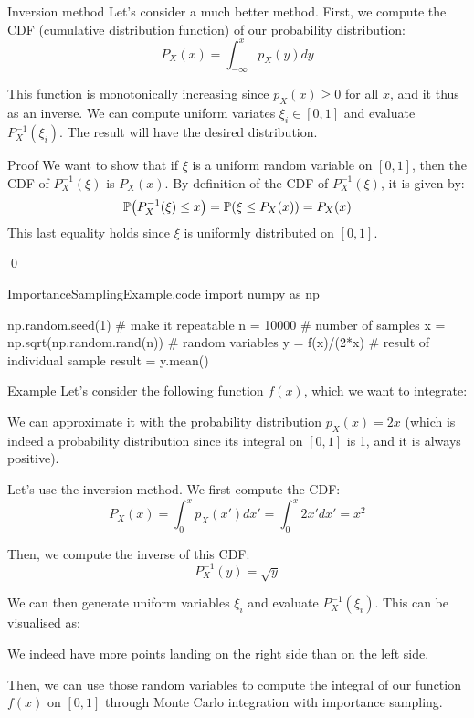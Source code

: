 \documentclass[a4paper]{article}
\begin{document}
\begin{parag}{Inversion method}
    Let's consider a much better method. First, we compute the CDF (cumulative distribution function) of our probability distribution: 
    \[P_{X}\left(x\right) = \int_{-\infty}^{x} p_X\left(y\right) d y\]
    
    This function is monotonically increasing since $p_X\left(x\right) \geq 0$ for all $x$, and it thus as an inverse. We can compute uniform variates $\xi_i \in \left[0, 1\right]$ and evaluate $P_X^{-1}\left(\xi_i\right)$. The result will have the desired distribution.

    \begin{subparag}{Proof}
        We want to show that if $\xi$ is a uniform random variable on $\left[0, 1\right]$, then the CDF of $P_X^{-1}\left(\xi\right)$ is $P_X\left(x\right)$. By definition of the CDF of $P_X^{-1}\left(\xi\right)$, it is given by:
        \[\prob\left(P_{X}^{-1}\left(\xi\right) \leq x\right) = \prob\left(\xi \leq P_{X}\left(x\right)\right) = P_{X}\left(x\right)\]
        This last equality holds since $\xi$ is uniformly distributed on $\left[0, 1\right]$.

        \qed
    \end{subparag}
\end{parag}

\begin{filecontents*}[overwrite]{ImportanceSamplingExample.code}
import numpy as np

np.random.seed(1)  # make it repeatable
n = 10000  # number of samples
x = np.sqrt(np.random.rand(n))  # random variables
y = f(x)/(2*x)  # result of individual sample
result = y.mean()
\end{filecontents*}

\begin{parag}{Example}
    Let's consider the following function $f\left(x\right)$, which we want to integrate:

    We can approximate it with the probability distribution $p_X\left(x\right) = 2x$ (which is indeed a probability distribution since its integral on $\left[0, 1\right]$ is 1, and it is always positive).

    Let's use the inversion method. We first compute the CDF:
    \[P_X\left(x\right) = \int_{0}^{x} p_{X}\left(x'\right) d x' = \int_{0}^{x} 2x' dx' = x^2\]
    
    Then, we compute the inverse of this CDF: 
    \[P^{-1}_{X}\left(y\right) = \sqrt{y}\]
    
    We can then generate uniform variables $\xi_i$ and evaluate $P_X^{-1}\left(\xi_i\right)$. This can be visualised as:
    
    We indeed have more points landing on the right side than on the left side.

    Then, we can use those random variables to compute the integral of our function $f\left(x\right)$ on $\left[0, 1\right]$ through Monte Carlo integration with importance sampling.
\end{parag}
\end{document}
